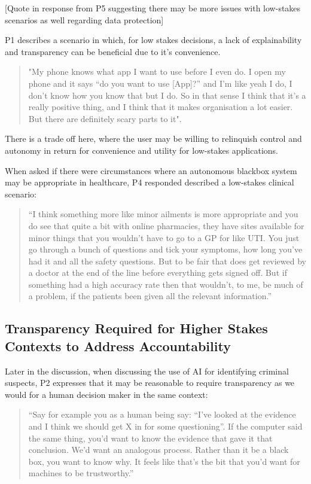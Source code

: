 \documentclass[manuscript,screen,review]{acmart}
\begin{document}
[Quote in response from P5 suggesting there may be more issues with low-stakes scenarios as well regarding data protection]

P1 describes a scenario in which, for low stakes decisions, a lack of explainability and transparency can be beneficial due to it’s convenience. 

\begin{quote}
"My phone knows what app I want to use before I even do. I open my phone and it says “do you want to use [App]?” and I'm like yeah I do, I don’t know how you know that but I do. So in that sense I think that it’s a really positive thing, and I think that it makes organisation a lot easier. But there are definitely scary parts to it". 
\end{quote}

There is a trade off here, where the user may be willing to relinquish control and autonomy in return for convenience and utility for low-stakes applications. 

When asked if there were circumstances where an autonomous blackbox system may be appropriate in healthcare, P4 responded described a low-stakes clinical scenario:

\begin{quote}
“I think something more like minor ailments is more appropriate and you do see that quite a bit with online pharmacies, they have sites available for minor things that you wouldn’t have to go to a GP for like UTI. You just go through a bunch of questions and tick your symptoms, how long you’ve had it and all the safety questions. But to be fair that does get reviewed by a doctor at the end of the line before everything gets signed off. But if something had a high accuracy rate then that wouldn’t, to me, be much of a problem, if the patients been given all the relevant information.”
\end{quote}

\subsection{Transparency Required for Higher Stakes Contexts to Address Accountability}

Later in the discussion, when discussing the use of AI for identifying criminal suspects, P2 expresses that it may be reasonable to require transparency as we would for a human decision maker in the same context:  

\begin{quote}
“Say for example you as a human being say: “I've looked at the evidence and I think we should get X in for some questioning”. If the computer said the same thing, you'd want to know the evidence that gave it that conclusion. We'd want an analogous process. Rather than it be a black box, you want to know why. It feels like that’s the bit that you'd want for machines to be trustworthy.”
\end{quote}
\end{document}
